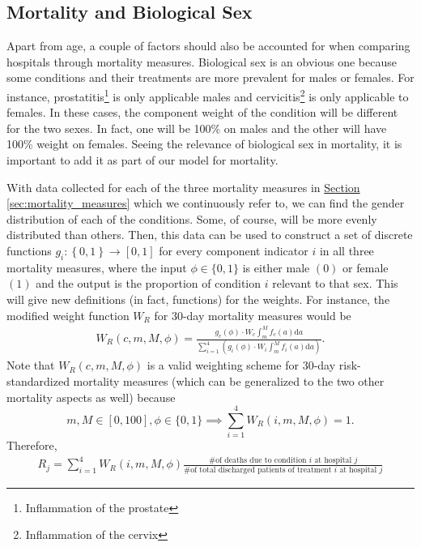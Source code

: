 \documentclass{article}
\begin{document}
\subsection{Mortality and Biological Sex}

Apart from age, a couple of factors should also be accounted for when comparing hospitals through mortality measures. Biological sex is an obvious one because some conditions and their treatments are more prevalent for males or females. For instance, prostatitis\footnote{Inflammation of the prostate} is only applicable males and cervicitis\footnote{Inflammation of the cervix} is only applicable to females. In these cases, the component weight of the condition will be different for the two sexes. In fact, one will be 100\% on males and the other will have 100\% weight on females. Seeing the relevance of biological sex in mortality, it is important to add it as part of our model for mortality.

With data collected for each of the three mortality measures in \hyperref[sec:mortality_measures]{Section \ref*{sec:mortality_measures}} which we continuously refer to, we can find the gender distribution of each of the conditions. Some, of course, will be more evenly distributed than others. Then, this data can be used to construct a set of discrete functions $g_i: \left\{0,1\right\} \to [0,1]$ for every component indicator $i$ in all three mortality measures, where the input $\phi \in \{0, 1\}$ is either male $(0)$ or female $(1)$ and the output is the proportion of condition $i$ relevant to that sex. This will give new definitions (in fact, functions) for the weights. For instance, the modified weight function $W_R$ for 30-day mortality measures would be
\begin{gather}W_R\left(c, m, M, \phi\right) = \frac{\displaystyle g_c \left(\phi\right) \cdot W_c\int_m^M \! f_c\left(a\right)\mathrm{d}a}{\displaystyle\sum_{i=1}^{4}\left(g_i\left(\phi\right) \cdot W_i \int_m^M \! f_i\left(a\right) \mathrm{d}a \right)}.\end{gather}
Note that $W_R\left(c, m,M,\phi\right)$ is a valid weighting scheme for 30-day risk-standardized mortality measures (which can be generalized to the two other mortality aspects as well) because $$m, M \in \left[0,100\right], \phi \in \{0,1\} \implies \sum_{i=1}^4 W_R\left(i, m,M,\phi\right) = 1.$$
Therefore,
\begin{gather}R_j = \sum_{i=1}^4 W_R \left(i, m,M,\phi\right) \frac{\text{\# of deaths due to condition $i$ at hospital $j$}}{\text{\# of total discharged patients of treatment $i$ at hospital $j$}} \end{gather}
\end{document}
